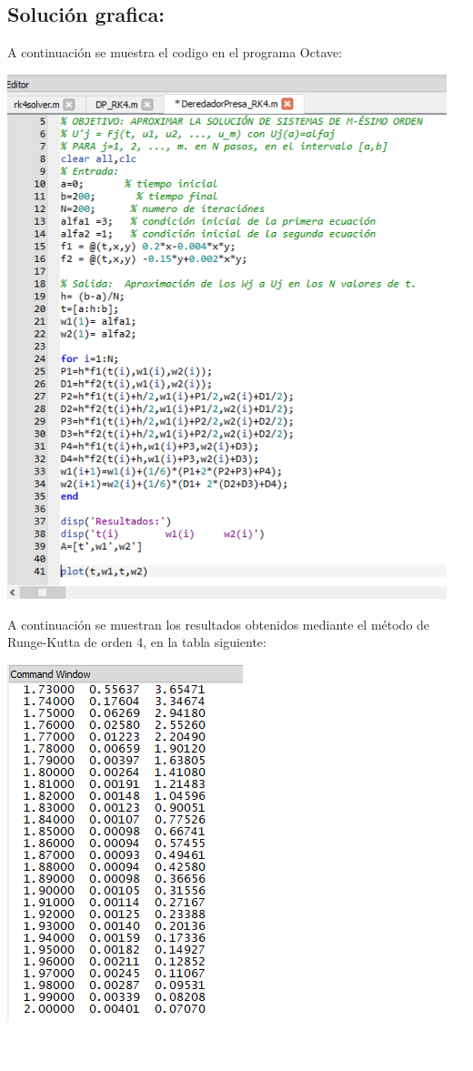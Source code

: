 \documentclass[10pt,letterpaper]{article}
\begin{document}
\subsection{Solución grafica:}
A continuación se muestra el codigo en el programa Octave:\\
\begin{center}
	\includegraphics[scale=1]{Pic/DPcode}\\
\end{center}
\pagebreak

A continuación se muestran los resultados obtenidos mediante el método de Runge-Kutta de orden 4, en la tabla siguiente:
\begin{center}
	\includegraphics[scale=1]{Pic/DP00}\\
\end{center}
\pagebreak
\end{document}
